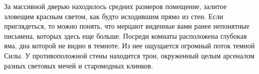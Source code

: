 За массивной дверью находилось средних размеров помещение, залитое зловещим красным светом, как будто исходившим прямо из стен.
Если приглядеться, то можно понять, что мерцают виденные вами ранее непонятные письмена, которых здесь еще больше.
Посреди комнаты расположена глубокая яма, дна которой не видно в темноте. Из нее ощущается огромный поток темной Силы. 
У противоположной стены находится трон, окруженный целым арсеналом разных световых мечей и старомодных клинков.
